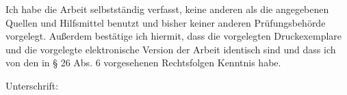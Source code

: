 \documentclass[a4paper,12pt]{scrreprt}
\begin{document}
	\noindent Ich habe die Arbeit selbstständig verfasst, keine anderen als die angegebenen Quellen und Hilfsmittel benutzt und bisher keiner anderen Prüfungsbehörde vorgelegt. Außerdem bestätige ich hiermit, dass die vorgelegten Druckexemplare und die vorgelegte elektronische Version der Arbeit identisch sind und dass ich von den in § 26 Abs. 6 vorgesehenen Rechtsfolgen Kenntnis habe.\par\hfill\par\noindent
	Unterschrift:\hspace{0.5cm} \makebox[1.5in]{\hrulefill}
\end{document}
